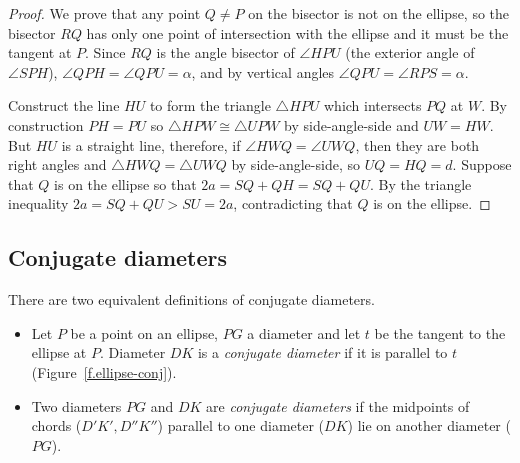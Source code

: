 
\begin{proof} 
We prove that any point $Q\neq P$ on the bisector is not on the ellipse, so the bisector $RQ$ has only one point of intersection with the ellipse and it must be the tangent at $P$. Since $RQ$ is the angle bisector of $\angle HPU$ (the exterior angle of $\angle SPH$), $\angle QPH =\angle QPU=\alpha$, and by vertical angles $\angle QPU=\angle RPS=\alpha$.

Construct the line $HU$ to form the triangle $\triangle HPU$ which intersects $PQ$ at $W$. By construction $PH=PU$ so $\triangle HPW\cong \triangle UPW$ by side-angle-side and $UW=HW$. But $HU$ is a straight line, therefore, if $\angle HWQ=\angle UWQ$, then they are both right angles and $\triangle HWQ=\triangle UWQ$ by side-angle-side, so $UQ=HQ=d$. Suppose that $Q$ is on the ellipse so that $2a=SQ+QH=SQ+QU$. By the triangle inequality $2a=SQ+QU>SU=2a$, contradicting that $Q$ is on the ellipse.\hqed
\end{proof}



\subsection{Conjugate diameters}

\begin{definition}\label{def.conjugate}
There are two equivalent definitions of conjugate diameters.
\begin{itemize}
\item Let $P$ be a point on an ellipse, $PG$ a diameter and let $t$ be the tangent to the ellipse at $P$. Diameter $DK$ is a \emph{conjugate diameter} if it is parallel to $t$ (Figure~\ref{f.ellipse-conj}).
\item Two diameters $PG$ and $DK$ are \emph{conjugate diameters} if the midpoints of chords ($D'K', D''K''$) parallel to one diameter ($DK$) lie on another diameter ($PG$).
\end{itemize}
\end{definition}


